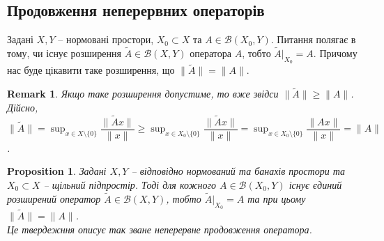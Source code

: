 \documentclass[a4paper, 10pt]{article}
\theoremstyle{theoremdd}
\theoremstyle{theoremdd}
\theoremstyle{theoremdd}
\theoremstyle{theoremdd}
\theoremstyle{theoremdd}
\newtheorem{proposition}[theorem]{Proposition}
\theoremstyle{theoremdd}
\newtheorem{remark}[theorem]{Remark}
\theoremstyle{theoremdd}
\theoremstyle{theoremdd}
\begin{document}
\subsection{Продовження неперервних операторів}
Задані $X,Y$ -- нормовані простори, $X_0 \subset X$ та $A \in \mathcal{B}(X_0,Y)$. Питання полягає в тому, чи існує розширення $\tilde{A} \in \mathcal{B}(X,Y)$ оператора $A$, тобто $\tilde{A}|_{X_0} = A$. Причому нас буде цікавити таке розширення, що $\|\tilde{A}\| = \|A\|$.

\begin{remark}
Якщо таке розширення допустиме, то вже звідси $\|\tilde{A}\| \geq \|A\|$. Дійсно,\\
$\|\tilde{A}\| = \displaystyle\sup_{x \in X \setminus \{0\}} \dfrac{\|\tilde{A}x\|}{\|x\|} \geq \sup_{x \in X_0 \setminus \{0\}} \dfrac{\|\tilde{A}x\|}{\|x\|} = \sup_{x \in X_0 \setminus \{0\}} \dfrac{\|Ax\|}{\|x\|} = \|A\|$.
\end{remark}

\begin{proposition}
Задані $X,Y$ -- відповідно нормований та банахів простори та $X_0 \subset X$ -- щільний підпростір. Тоді для кожного $A \in \mathcal{B}(X_0,Y)$ існує єдиний розширений оператор $\tilde{A} \in \mathcal{B}(X,Y)$, тобто $\tilde{A}|_{X_0} = A$ та при цьому $\|\tilde{A}\| = \|A\|$.\\
\textit{Це твердежння описує так зване неперервне продовження оператора.}
\end{proposition}
\end{document}
